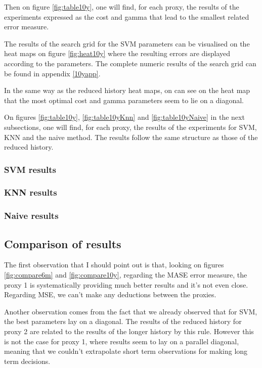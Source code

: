 \documentclass[11pt,a4paper,oneside]{book}
\begin{document}
Then on figure \ref{fig:table10y}, one will find, for each proxy, the results of the experiments expressed as the cost and gamma that lead to the smallest related error measure.


The results of the search grid for the SVM parameters can be visualised on the heat maps on figure \ref{fig:heat10y} where the resulting errors are displayed according to the parameters. The complete numeric results of the search grid can be found in appendix \ref{10yapp}. 

In the same way as the reduced history heat maps, on can see on the heat map that the most optimal cost and gamma parameters seem to lie on a diagonal.

On figures \ref{fig:table10y}, \ref{fig:table10yKnn} and \ref{fig:table10yNaive} in the next subsections, one will find, for each proxy, the results of the experiments for SVM, KNN and the naive method. The results follow the same structure as those of the reduced history.






\clearpage
\subsubsection{SVM results}


\clearpage
\subsubsection{KNN results}


\clearpage
\subsubsection{Naive results}




\clearpage
\subsection{Comparison of results}


The first observation that I should point out is that, looking on figures \ref{fig:compare6m} and \ref{fig:compare10y}, regarding the MASE error measure, the proxy 1 is systematically providing much better results and it's not even close. Regarding MSE, we can't make any deductions between the proxies. 

Another observation comes from the fact that we already observed that for SVM, the best parameters lay on a diagonal. The results of the reduced history for proxy 2 are related to the results of the longer history by this rule. However this is not the case for proxy 1, where results seem to lay on a parallel diagonal, meaning that we couldn't extrapolate short term observations for making long term decisions.
\end{document}
